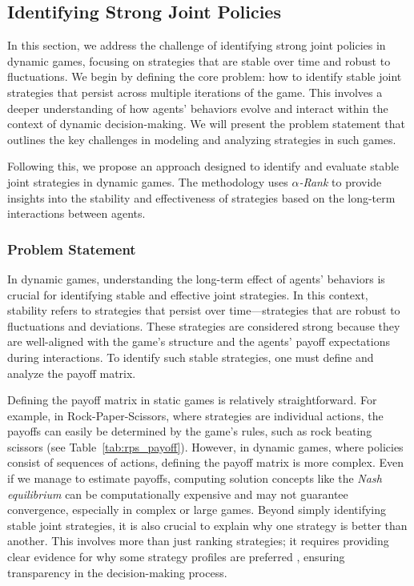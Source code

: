 \subsection{Identifying Strong Joint Policies}

    In this section, we address the challenge of identifying strong joint policies in dynamic games, focusing on strategies that are stable over time and robust to fluctuations. We begin by defining the core problem: how to identify stable joint strategies that persist across multiple iterations of the game. This involves a deeper understanding of how agents’ behaviors evolve and interact within the context of dynamic decision-making. We will present the problem statement that outlines the key challenges in modeling and analyzing strategies in such games.\tinydouble

    \noindent
    Following this, we propose an approach designed to identify and evaluate stable joint strategies in dynamic games. The methodology uses \emph{$\alpha$-Rank} to provide insights into the stability and effectiveness of strategies based on the long-term interactions between agents.

    \subsubsection{Problem Statement}

        In dynamic games, understanding the long-term effect of agents' behaviors is crucial for identifying stable and effective joint strategies. In this context, stability refers to strategies that persist over time—strategies that are robust to fluctuations and deviations. These strategies are considered strong because they are well-aligned with the game’s structure and the agents' payoff expectations during interactions. To identify such stable strategies, one must define and analyze the payoff matrix.\tinydouble
        
        \noindent
        Defining the payoff matrix in static games is relatively straightforward. For example, in Rock-Paper-Scissors, where strategies are individual actions, the payoffs can easily be determined by the game’s rules, such as rock beating scissors (see Table~\ref{tab:rps_payoff}). However, in dynamic games, where policies consist of sequences of actions, defining the payoff matrix is more complex. Even if we manage to estimate payoffs, computing solution concepts like the \emph{Nash equilibrium} can be computationally expensive and may not guarantee convergence, especially in complex or large games. Beyond simply identifying stable joint strategies, it is also crucial to explain why one strategy is better than another. This involves more than just ranking strategies; it requires providing clear evidence for why some strategy profiles are preferred \cite{Vouros_2022}, ensuring transparency in the decision-making process.\tinydouble

